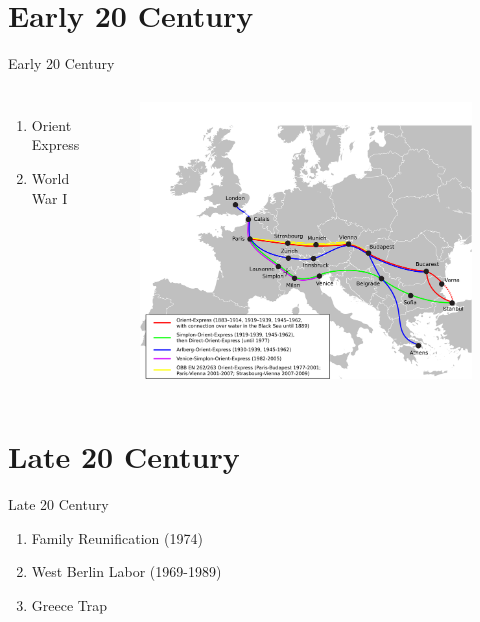 \documentclass{beamer}
\begin{document}
\section{Early 20 Century}
\begin{frame}{Early 20 Century}
	\begin{columns}
			\begin{enumerate}
				\item Orient Express
				\item World War I
			\end{enumerate}
			\vspace{-0.2\textheight}
			\begin{figure}[ht]
				\centering
				\includegraphics[width=1.1\textwidth]{oxpress.png}
			\end{figure}
	\end{columns}
\end{frame}

\section{Late 20 Century}
\begin{frame}{Late 20 Century}
	\begin{enumerate}
		\item Family Reunification (1974)
		\item West Berlin Labor (1969-1989)
		\item Greece Trap
	\end{enumerate}
\end{frame}
\end{document}
